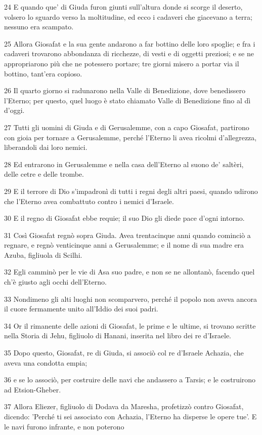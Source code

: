 \par 24 E quando que' di Giuda furon giunti sull'altura donde si scorge il deserto, volsero lo sguardo verso la moltitudine, ed ecco i cadaveri che giacevano a terra; nessuno era scampato.
\par 25 Allora Giosafat e la sua gente andarono a far bottino delle loro spoglie; e fra i cadaveri trovarono abbondanza di ricchezze, di vesti e di oggetti preziosi; e se ne appropriarono più che ne potessero portare; tre giorni misero a portar via il bottino, tant'era copioso.
\par 26 Il quarto giorno si radunarono nella Valle di Benedizione, dove benedissero l'Eterno; per questo, quel luogo è stato chiamato Valle di Benedizione fino al dì d'oggi.
\par 27 Tutti gli uomini di Giuda e di Gerusalemme, con a capo Giosafat, partirono con gioia per tornare a Gerusalemme, perché l'Eterno li avea ricolmi d'allegrezza, liberandoli dai loro nemici.
\par 28 Ed entrarono in Gerusalemme e nella casa dell'Eterno al suono de' saltèri, delle cetre e delle trombe.
\par 29 E il terrore di Dio s'impadronì di tutti i regni degli altri paesi, quando udirono che l'Eterno avea combattuto contro i nemici d'Israele.
\par 30 E il regno di Giosafat ebbe requie; il suo Dio gli diede pace d'ogni intorno.
\par 31 Così Giosafat regnò sopra Giuda. Avea trentacinque anni quando cominciò a regnare, e regnò venticinque anni a Gerusalemme; e il nome di sua madre era Azuba, figliuola di Scilhi.
\par 32 Egli camminò per le vie di Asa suo padre, e non se ne allontanò, facendo quel ch'è giusto agli occhi dell'Eterno.
\par 33 Nondimeno gli alti luoghi non scomparvero, perché il popolo non aveva ancora il cuore fermamente unito all'Iddio dei suoi padri.
\par 34 Or il rimanente delle azioni di Giosafat, le prime e le ultime, si trovano scritte nella Storia di Jehu, figliuolo di Hanani, inserita nel libro dei re d'Israele.
\par 35 Dopo questo, Giosafat, re di Giuda, si associò col re d'Israele Achazia, che aveva una condotta empia;
\par 36 e se lo associò, per costruire delle navi che andassero a Tarsis; e le costruirono ad Etsion-Gheber.
\par 37 Allora Eliezer, figliuolo di Dodava da Maresha, profetizzò contro Giosafat, dicendo: 'Perché ti sei associato con Achazia, l'Eterno ha disperse le opere tue'. E le navi furono infrante, e non poterono

